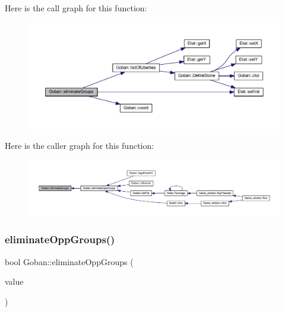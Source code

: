 Here is the call graph for this function\+:\nopagebreak
\begin{figure}[H]
\begin{center}
\leavevmode
\includegraphics[width=350pt]{class_goban_a1ec70508987f66afff5f8df381731fac_cgraph}
\end{center}
\end{figure}
Here is the caller graph for this function\+:\nopagebreak
\begin{figure}[H]
\begin{center}
\leavevmode
\includegraphics[width=350pt]{class_goban_a1ec70508987f66afff5f8df381731fac_icgraph}
\end{center}
\end{figure}
\mbox{\label{class_goban_a7858b815885e4af36f05f9d26182cb07}} 
\subsubsection{\texorpdfstring{eliminate\+Opp\+Groups()}{eliminateOppGroups()}}
{\footnotesize\ttfamily bool Goban\+::eliminate\+Opp\+Groups (\begin{DoxyParamCaption}\item[{const \hyperlink{class_etat_af3ddb2296ffc379b7f3ad2bf832f294e}{Etat\+::\+V\+AL} \&}]{value }\end{DoxyParamCaption})}

